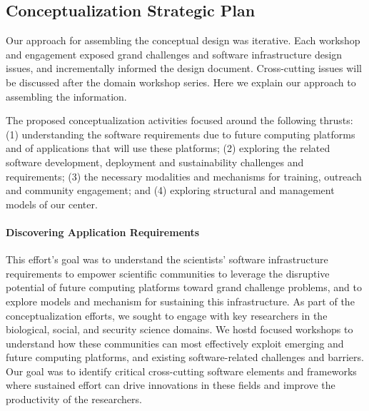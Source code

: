 \subsection{Conceptualization Strategic Plan}
Our approach for assembling the conceptual design was iterative. 
Each workshop and engagement exposed grand challenges and software infrastructure design issues, 
and incrementally informed the design document. 
Cross-cutting issues will be discussed after the domain workshop series. 
Here we explain our approach to assembling the information.

The proposed conceptualization activities focused around the following thrusts: 
(1) understanding
the software requirements due to future computing platforms and of applications that will
use these platforms; 
(2) exploring the related software development, deployment and sustainability
challenges and requirements; 
(3) the necessary modalities and mechanisms for training, outreach
and community engagement; and 
(4) exploring structural and management models of our center.

\paragraph{Discovering Application Requirements} 
This effort's goal was to understand the scientists' software
infrastructure requirements to empower scientific communities to leverage the disruptive
potential of future computing platforms toward grand challenge problems, 
and to explore models and mechanism for sustaining this infrastructure. 
As part of the conceptualization efforts, we sought to
engage with key researchers in the biological, social, and security science domains. 
We hostd focused workshops to understand how these
communities can most effectively exploit emerging and future computing platforms, 
and existing software-related challenges and barriers. 
Our goal was to identify critical cross-cutting software
elements and frameworks where sustained effort can drive innovations in these fields and improve
the productivity of the researchers. 


